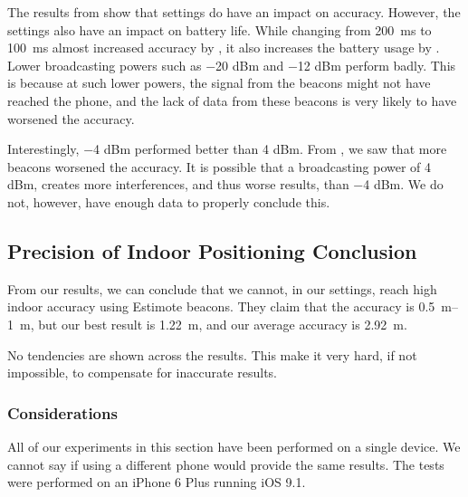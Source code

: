 The results from  show that settings do have an impact on accuracy. 
However, the settings also have an impact on battery life. 
While changing from \SI{200}{\milli\second} to \SI{100}{\milli\second} almost increased accuracy by ,
it also increases the battery usage by .
Lower broadcasting powers such as \num{-20} dBm and \num{-12} dBm perform badly. 
This is because at such lower powers, 
the signal from the beacons might not have reached the phone, 
and the lack of data from these beacons is very likely to have worsened the accuracy.

Interestingly, \num{-4} dBm performed better than \num{4} dBm.
From , we saw that more beacons worsened the accuracy. 
It is possible that a broadcasting power of \num{4} dBm,
creates more interferences, and thus worse results, than \num{-4} dBm. 
We do not, however, have enough data to properly conclude this. 

\subsection{Precision of Indoor Positioning Conclusion}
From our results, we can conclude that we cannot, 
in our settings, reach high indoor accuracy using Estimote beacons. 
They claim that the accuracy is \SIrange{0.5}{1}{\meter}, 
but our best result is \SI{1.22}{\meter}, 
and our average accuracy is \SI{2.92}{\meter}.

No tendencies are shown across the results. 
This make it very hard, if not impossible,
to compensate for inaccurate results.  

\subsubsection{Considerations}
All of our experiments in this section have been performed on a single device.
We cannot say if using a different phone would provide the same results.
The tests were performed on an iPhone 6 Plus running iOS 9.1.

